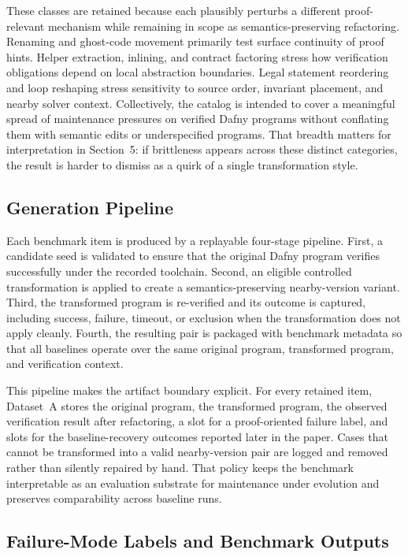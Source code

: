 These classes are retained because each plausibly perturbs a different proof-relevant mechanism while remaining in scope as semantics-preserving refactoring. Renaming and ghost-code movement primarily test surface continuity of proof hints. Helper extraction, inlining, and contract factoring stress how verification obligations depend on local abstraction boundaries. Legal statement reordering and loop reshaping stress sensitivity to source order, invariant placement, and nearby solver context. Collectively, the catalog is intended to cover a meaningful spread of maintenance pressures on verified Dafny programs without conflating them with semantic edits or underspecified programs. That breadth matters for interpretation in Section~5: if brittleness appears across these distinct categories, the result is harder to dismiss as a quirk of a single transformation style.

\subsection{Generation Pipeline}

Each benchmark item is produced by a replayable four-stage pipeline. First, a candidate seed is validated to ensure that the original Dafny program verifies successfully under the recorded toolchain. Second, an eligible controlled transformation is applied to create a semantics-preserving nearby-version variant. Third, the transformed program is re-verified and its outcome is captured, including success, failure, timeout, or exclusion when the transformation does not apply cleanly. Fourth, the resulting pair is packaged with benchmark metadata so that all baselines operate over the same original program, transformed program, and verification context.

This pipeline makes the artifact boundary explicit. For every retained item, Dataset~A stores the original program, the transformed program, the observed verification result after refactoring, a slot for a proof-oriented failure label, and slots for the baseline-recovery outcomes reported later in the paper. Cases that cannot be transformed into a valid nearby-version pair are logged and removed rather than silently repaired by hand. That policy keeps the benchmark interpretable as an evaluation substrate for maintenance under evolution and preserves comparability across baseline runs.

\subsection{Failure-Mode Labels and Benchmark Outputs}

